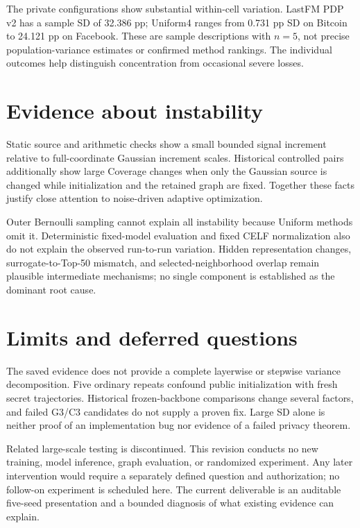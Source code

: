 The private configurations show substantial within-cell variation. LastFM PDP v2 has a sample SD of 32.386 pp; Uniform4 ranges from 0.731 pp SD on Bitcoin to 24.121 pp on Facebook. These are sample descriptions with $n=5$, not precise population-variance estimates or confirmed method rankings. The individual outcomes help distinguish concentration from occasional severe losses.

\section{Evidence about instability}
Static source and arithmetic checks show a small bounded signal increment relative to full-coordinate Gaussian increment scales. Historical controlled pairs additionally show large Coverage changes when only the Gaussian source is changed while initialization and the retained graph are fixed. Together these facts justify close attention to noise-driven adaptive optimization.

Outer Bernoulli sampling cannot explain all instability because Uniform methods omit it. Deterministic fixed-model evaluation and fixed CELF normalization also do not explain the observed run-to-run variation. Hidden representation changes, surrogate-to-Top-50 mismatch, and selected-neighborhood overlap remain plausible intermediate mechanisms; no single component is established as the dominant root cause.

\section{Limits and deferred questions}
The saved evidence does not provide a complete layerwise or stepwise variance decomposition. Five ordinary repeats confound public initialization with fresh secret trajectories. Historical frozen-backbone comparisons change several factors, and failed G3/C3 candidates do not supply a proven fix. Large SD alone is neither proof of an implementation bug nor evidence of a failed privacy theorem.

Related large-scale testing is discontinued. This revision conducts no new training, model inference, graph evaluation, or randomized experiment. Any later intervention would require a separately defined question and authorization; no follow-on experiment is scheduled here. The current deliverable is an auditable five-seed presentation and a bounded diagnosis of what existing evidence can explain.
